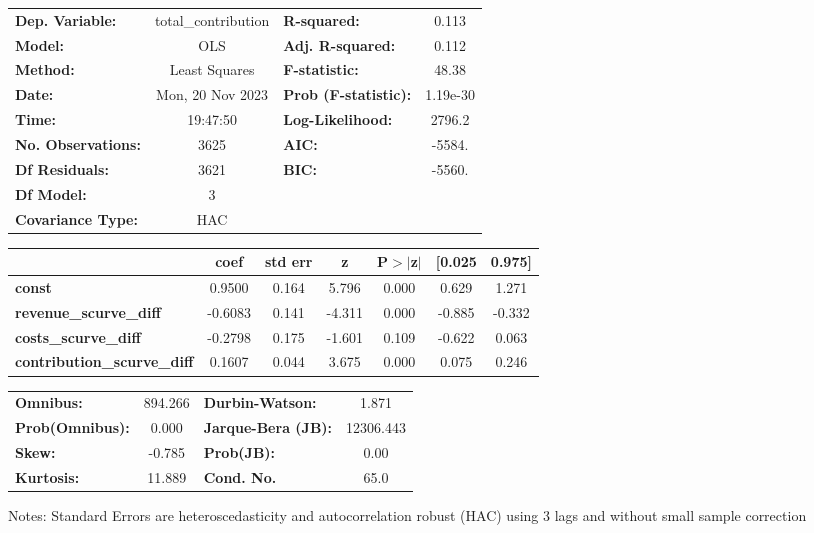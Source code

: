 \begin{center}
\begin{tabular}{lclc}
\toprule
\textbf{Dep. Variable:}             & total\_contribution & \textbf{  R-squared:         } &     0.113   \\
\textbf{Model:}                     &         OLS         & \textbf{  Adj. R-squared:    } &     0.112   \\
\textbf{Method:}                    &    Least Squares    & \textbf{  F-statistic:       } &     48.38   \\
\textbf{Date:}                      &   Mon, 20 Nov 2023  & \textbf{  Prob (F-statistic):} &  1.19e-30   \\
\textbf{Time:}                      &       19:47:50      & \textbf{  Log-Likelihood:    } &    2796.2   \\
\textbf{No. Observations:}          &          3625       & \textbf{  AIC:               } &    -5584.   \\
\textbf{Df Residuals:}              &          3621       & \textbf{  BIC:               } &    -5560.   \\
\textbf{Df Model:}                  &             3       & \textbf{                     } &             \\
\textbf{Covariance Type:}           &         HAC         & \textbf{                     } &             \\
\bottomrule
\end{tabular}
\begin{tabular}{lcccccc}
                                    & \textbf{coef} & \textbf{std err} & \textbf{z} & \textbf{P$> |$z$|$} & \textbf{[0.025} & \textbf{0.975]}  \\
\midrule
\textbf{const}                      &       0.9500  &        0.164     &     5.796  &         0.000        &        0.629    &        1.271     \\
\textbf{revenue\_scurve\_diff}      &      -0.6083  &        0.141     &    -4.311  &         0.000        &       -0.885    &       -0.332     \\
\textbf{costs\_scurve\_diff}        &      -0.2798  &        0.175     &    -1.601  &         0.109        &       -0.622    &        0.063     \\
\textbf{contribution\_scurve\_diff} &       0.1607  &        0.044     &     3.675  &         0.000        &        0.075    &        0.246     \\
\bottomrule
\end{tabular}
\begin{tabular}{lclc}
\textbf{Omnibus:}       & 894.266 & \textbf{  Durbin-Watson:     } &     1.871  \\
\textbf{Prob(Omnibus):} &   0.000 & \textbf{  Jarque-Bera (JB):  } & 12306.443  \\
\textbf{Skew:}          &  -0.785 & \textbf{  Prob(JB):          } &      0.00  \\
\textbf{Kurtosis:}      &  11.889 & \textbf{  Cond. No.          } &      65.0  \\
\bottomrule
\end{tabular}
\end{center}

Notes: \newline
 [1] Standard Errors are heteroscedasticity and autocorrelation robust (HAC) using 3 lags and without small sample correction